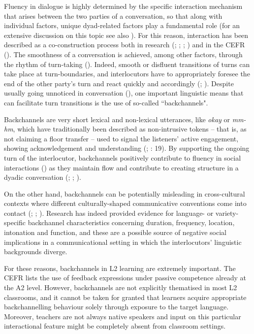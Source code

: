 Fluency in dialogue is highly determined by the specific interaction mechanism that arises between the two parties of a conversation, so that along with individual factors, unique dyad-related factors play a fundamental role (for an extensive discussion on this topic see also \citealt{SbrannaEtAl2020}). For this reason, interaction has been described as a co-construction process both in research (\citealt{Hall1995}; \citealt{HeYoung1998}; \citealt{JacobyOchs1995}; \citealt{McCarthy2009}) and in the CEFR (\citealt{GoodierNorth2018}). The smoothness of a conversation is achieved, among other factors, through the rhythm of turn-taking (\citealt{SchegloffJefferson1974}). Indeed, smooth or disfluent transitions of turns can take place at turn-boundaries, and interlocutors have to appropriately foresee the end of the other party’s turn and react quickly and accordingly (\citealt{BögelsTorreira2015}; \citealt{Levinson2016}). Despite usually going unnoticed in conversation (\citealt{ShelleyGonzalez2013}), one important linguistic means that can facilitate turn transitions is the use of so-called ``backchannels".

Backchannels are very short lexical and non-lexical utterances, like \textit{okay} or \textit{mm-hm}, which have traditionally been described as non-intrusive tokens – that is, as not claiming a floor transfer – used to signal the listeners’ active engagement, showing acknowledgement and understanding (\citealt{Schegloff1982}; \citealt{Yngve1970}: 19). By supporting the ongoing turn of the interlocutor, backchannels positively contribute to fluency in social interactions (\citealt{Keeffe2013}) as they maintain flow and contribute to creating structure in a dyadic conversation (\citealt{LewisSwezey1982}; \citealt{SchegloffJefferson1974}; \citealt{Schegloff1982}).

On the other hand, backchannels can be potentially misleading in cross-cultural contexts where different culturally-shaped communicative conventions come into contact (\citealt{Cutrone2005,Cutrone2014}; \citealt{EbnerGrice2016}; \citealt{Li2006}). Research has indeed provided evidence for language- or variety-specific backchannel characteristics concerning duration, frequency, location, intonation and function, and these are a possible source of negative social implications in a communicational setting in which the interlocutors’ linguistic backgrounds diverge.

For these reasons, backchannels in L2 learning are extremely important. The CEFR \citep{FiguerasEtAl2009} lists the use of feedback expressions under passive competence already at the A2 level. However, backchannels are not explicitly thematised in most L2 classrooms, and it cannot be taken for granted that learners acquire appropriate backchannelling behaviour solely through exposure to the target language. Moreover, teachers are not always native speakers and input on this particular interactional feature might be completely absent from classroom settings.

